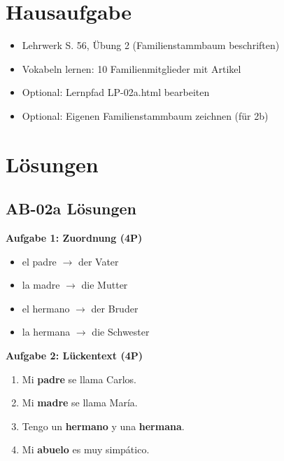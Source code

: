\documentclass[11pt,a4paper]{article}
\begin{document}
\section{Hausaufgabe}

\begin{itemize}
    \item Lehrwerk S. 56, Übung 2 (Familienstammbaum beschriften)
    \item Vokabeln lernen: 10 Familienmitglieder mit Artikel
    \item Optional: Lernpfad LP-02a.html bearbeiten
    \item Optional: Eigenen Familienstammbaum zeichnen (für 2b)
\end{itemize}

\section{Lösungen}

\subsection{AB-02a Lösungen}

\textbf{Aufgabe 1: Zuordnung (4P)}
\begin{itemize}
    \item el padre $\rightarrow$ der Vater
    \item la madre $\rightarrow$ die Mutter
    \item el hermano $\rightarrow$ der Bruder
    \item la hermana $\rightarrow$ die Schwester
\end{itemize}

\textbf{Aufgabe 2: Lückentext (4P)}
\begin{enumerate}[label=\alph*)]
    \item Mi \textbf{padre} se llama Carlos.
    \item Mi \textbf{madre} se llama María.
    \item Tengo un \textbf{hermano} y una \textbf{hermana}.
    \item Mi \textbf{abuelo} es muy simpático.
\end{enumerate}
\end{document}
